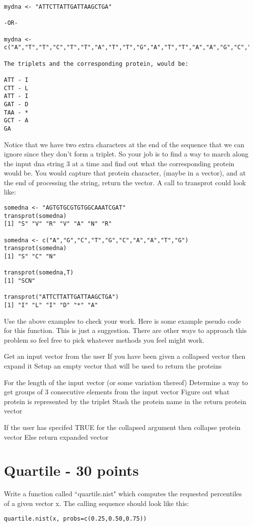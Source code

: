 \documentclass{article}
\begin{document}
\begin{verbatim}
mydna <- "ATTCTTATTGATTAAGCTGA"

-OR- 

mydna <- c("A","T","T","C","T","T","A","T","T","G","A","T","T","A","A","G","C","T","G","A")

The triplets and the corresponding protein, would be: 

ATT - I 
CTT - L
ATT - I
GAT - D
TAA - * 
GCT - A
GA
\end{verbatim}

Notice that we have two extra characters at the end of the sequence that we can ignore since they don't form a triplet. So your job is to find a way to march along the input dna string 3 at a time and find out what the corresponding protein would be. You would capture that protein character, (maybe in a vector), and at the end of processing the string, return the vector. A call to transprot could look like:

\begin{verbatim}
somedna <- "AGTGTGCGTGTGGCAAATCGAT"
transprot(somedna)
[1] "S" "V" "R" "V" "A" "N" "R"
 
somedna <- c("A","G","C","T","G","C","A","A","T","G")
transprot(somedna)
[1] "S" "C" "N"

transprot(somedna,T)
[1] "SCN"

transprot("ATTCTTATTGATTAAGCTGA")
[1] "I" "L" "I" "D" "*" "A"
\end{verbatim}

Use the above examples to check your work. Here is some example pseudo code for this function. This is just a suggestion. There are other ways to approach this problem so feel free to pick whatever methods you feel might work.

 \begin{PseudoCode}
Get an input vector from the user
If you have been given a collapsed vector then
 expand it
Setup an empty vector that will be used to return the proteins

For the length of the input vector (or some variation thereof)
 Determine a way to get groups of 3 consecutive elements from the input vector
 Figure out what protein is represented by the triplet
 Stash the protein name in the return protein vector

If the user has specifed TRUE for the collapsed argument then 
   collapse protein vector
Else
  return expanded vector
\end{PseudoCode}


\section{Quartile - 30 points}
Write a function called ``quartile.nist" which computes the requested percentiles of a given vector x. The calling sequence should look like this:
\begin{verbatim}
quartile.nist(x, probs=c(0.25,0.50,0.75))
\end{verbatim}
\end{document}

